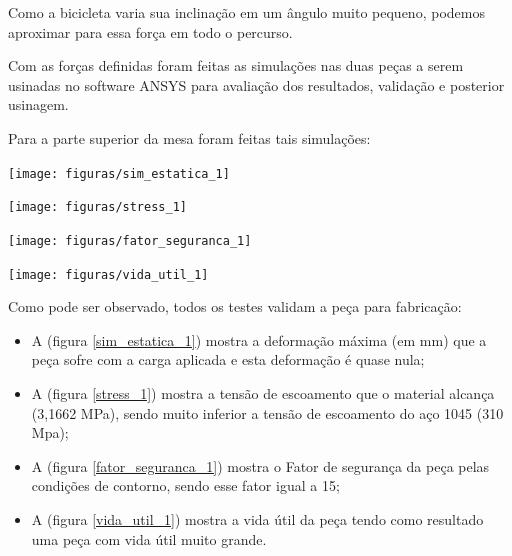     Como a bicicleta varia sua inclinação em um ângulo muito pequeno, podemos aproximar para essa força em todo o percurso.

    Com as forças definidas foram feitas as simulações nas duas peças a serem usinadas no software ANSYS para avaliação dos resultados, validação e posterior usinagem.

    Para a parte superior da mesa foram feitas tais simulações:

     \begin{center}
    	\texttt{[image: figuras/sim\_estatica\_1]}
        \label{sim_estatica_1}
    \end{center}

     \begin{center}
    	\texttt{[image: figuras/stress\_1]}
        \label{stress_1}
    \end{center}

     \begin{center}
    	\texttt{[image: figuras/fator\_seguranca\_1]}
        \label{fator_seguranca_1}
    \end{center}

     \begin{center}
    	\texttt{[image: figuras/vida\_util\_1]}
        \label{vida_util_1}
    \end{center}

    Como pode ser observado, todos os testes validam a peça para fabricação:

    \begin{itemize}
        \item A (figura \ref{sim_estatica_1}) mostra a deformação máxima (em mm) que a peça sofre com a carga aplicada e esta deformação é quase nula;
        \item A (figura \ref{stress_1}) mostra a tensão de escoamento que o material alcança (3,1662 MPa), sendo muito inferior a tensão de escoamento do aço 1045 (310 Mpa);
        \item A (figura \ref{fator_seguranca_1}) mostra o Fator de segurança da peça pelas condições de contorno, sendo esse fator igual a 15;
        \item A (figura \ref{vida_util_1}) mostra a vida útil da peça tendo como resultado uma peça com vida útil muito grande.
    \end{itemize}

